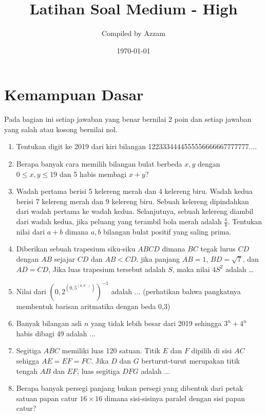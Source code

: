 \documentclass[12pt]{scrartcl}
\begin{document}
	\title{Latihan Soal Medium - High} %
	\date{\today}
	\author{Compiled by Azzam}
	\maketitle

\renewcommand*\contentsname{Daftar Isi}
\tableofcontents

\newpage
	\section{Kemampuan Dasar}
	Pada bagian ini setiap jawaban yang benar bernilai 2 poin dan setiap jawaban yang salah
	atau kosong bernilai nol.
	\begin{enumerate}
		\item
		Tentukan digit ke 2019 dari kiri bilangan 1223334444555556666667777777....
		
		\item
		Berapa banyak cara memilih bilangan bulat berbeda $x, y$ dengan $0 \le x, y \le 19$ dan 5 habis membagi $x + y$?
		
		\item
		Wadah pertama berisi 5 kelereng merah dan 4 kelereng biru. Wadah kedua berisi 7 kelereng merah dan
		9 kelereng biru. Sebuah kelereng dipindahkan dari wadah pertama ke wadah kedua. Selanjutnya, sebuah
		kelereng diambil dari wadah kedua, jika peluang yang terambil bola merah adalah
		$\frac{a}{b}$. Tentukan nilai dari $a+b$ dimana $a, b$ bilangan bulat positif yang saling prima.
		
		\item
		Diberikan sebuah trapesium siku-siku $ABCD$ dimana $BC$ tegak lurus $CD$ dengan $AB$ sejajar $CD$ dan $AB < CD$. jika panjang $AB = 1$, $BD = \sqrt{7}$, dan $AD = CD$, Jika luas trapesium tersebut adalah $S$, maka nilai $4S^2$ adalah \dots
		
		\item Nilai dari $\left(0,2 ^{\left(0,5 ^{\left(0,8 ^{...} \right)} \right)} \right)^{-1}$ adalah $\dots$ (perhatikan bahwa pangkatnya membentuk barisan aritmatika dengan beda 0,3)
		
		\item Banyak bilangan asli $n$ yang tidak lebih besar dari 2019 sehingga $3^n+4^n$ habis dibagi 49 adalah $\dots$
		
		\item Segitiga $ABC$ memiliki luas 120 satuan. Titik $E$ dan $F$ dipilih di sisi $AC$ sehigga $AE=EF=FC$. Jika $D$ dan $G$ berturut-turut merupakan titik tengah $AB$ dan $EF$, luas segitiga $DFG$ adalah $\dots$
		
		\item
		Berapa banyak persegi panjang bukan persegi yang dibentuk dari petak satuan papan catur $16 \times 16$ dimana sisi-sisinya paralel dengan sisi papan catur?
		
	\end{enumerate}
\end{document}

